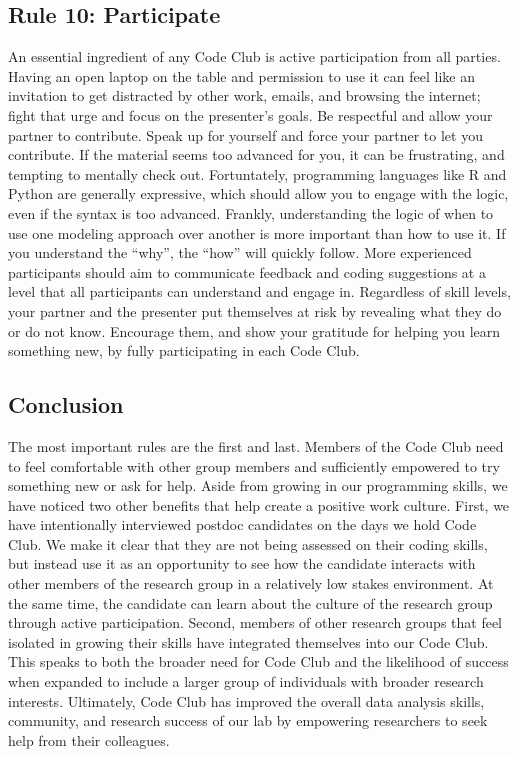 \documentclass[11pt,]{article}
\begin{document}
\subsection{Rule 10: Participate}\label{rule-10-participate}

An essential ingredient of any Code Club is active participation from
all parties. Having an open laptop on the table and permission to use it
can feel like an invitation to get distracted by other work, emails, and
browsing the internet; fight that urge and focus on the presenter's
goals. Be respectful and allow your partner to contribute. Speak up for
yourself and force your partner to let you contribute. If the material
seems too advanced for you, it can be frustrating, and tempting to
mentally check out. Fortuntately, programming languages like R and
Python are generally expressive, which should allow you to engage with
the logic, even if the syntax is too advanced. Frankly, understanding
the logic of when to use one modeling approach over another is more
important than how to use it. If you understand the ``why'', the ``how''
will quickly follow. More experienced participants should aim to
communicate feedback and coding suggestions at a level that all
participants can understand and engage in. Regardless of skill levels,
your partner and the presenter put themselves at risk by revealing what
they do or do not know. Encourage them, and show your gratitude for
helping you learn something new, by fully participating in each Code
Club.

\subsection{Conclusion}\label{conclusion}

The most important rules are the first and last. Members of the Code
Club need to feel comfortable with other group members and sufficiently
empowered to try something new or ask for help. Aside from growing in
our programming skills, we have noticed two other benefits that help
create a positive work culture. First, we have intentionally interviewed
postdoc candidates on the days we hold Code Club. We make it clear that
they are not being assessed on their coding skills, but instead use it
as an opportunity to see how the candidate interacts with other members
of the research group in a relatively low stakes environment. At the
same time, the candidate can learn about the culture of the research
group through active participation. Second, members of other research
groups that feel isolated in growing their skills have integrated
themselves into our Code Club. This speaks to both the broader need for
Code Club and the likelihood of success when expanded to include a
larger group of individuals with broader research interests. Ultimately,
Code Club has improved the overall data analysis skills, community, and
research success of our lab by empowering researchers to seek help from
their colleagues.
\end{document}

